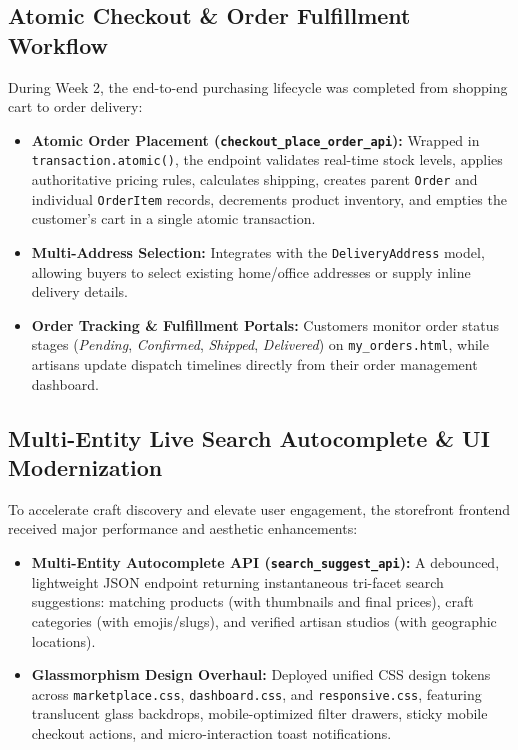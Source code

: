 \documentclass[12pt,a4paper]{article}
\begin{document}
\subsection{Atomic Checkout \& Order Fulfillment Workflow}
During Week 2, the end-to-end purchasing lifecycle was completed from shopping cart to order delivery:
\begin{itemize}
    \item \textbf{Atomic Order Placement (\texttt{checkout\_place\_order\_api}):} Wrapped in \texttt{transaction.atomic()}, the endpoint validates real-time stock levels, applies authoritative pricing rules, calculates shipping, creates parent \texttt{Order} and individual \texttt{OrderItem} records, decrements product inventory, and empties the customer's cart in a single atomic transaction.
    \item \textbf{Multi-Address Selection:} Integrates with the \texttt{DeliveryAddress} model, allowing buyers to select existing home/office addresses or supply inline delivery details.
    \item \textbf{Order Tracking \& Fulfillment Portals:} Customers monitor order status stages (\emph{Pending}, \emph{Confirmed}, \emph{Shipped}, \emph{Delivered}) on \texttt{my\_orders.html}, while artisans update dispatch timelines directly from their order management dashboard.
\end{itemize}

\subsection{Multi-Entity Live Search Autocomplete \& UI Modernization}
To accelerate craft discovery and elevate user engagement, the storefront frontend received major performance and aesthetic enhancements:
\begin{itemize}
    \item \textbf{Multi-Entity Autocomplete API (\texttt{search\_suggest\_api}):} A debounced, lightweight JSON endpoint returning instantaneous tri-facet search suggestions: matching products (with thumbnails and final prices), craft categories (with emojis/slugs), and verified artisan studios (with geographic locations).
    \item \textbf{Glassmorphism Design Overhaul:} Deployed unified CSS design tokens across \texttt{marketplace.css}, \texttt{dashboard.css}, and \texttt{responsive.css}, featuring translucent glass backdrops, mobile-optimized filter drawers, sticky mobile checkout actions, and micro-interaction toast notifications.
\end{itemize}
\end{document}

